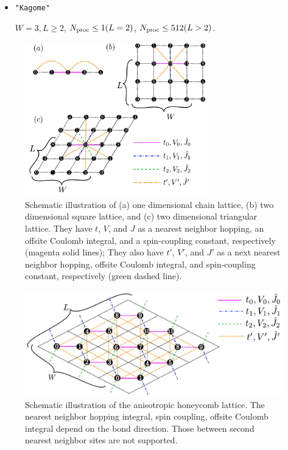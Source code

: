\begin{itemize}
\begin{itemize}
  \item \verb|"Kagome"|

    $W=3, L \geq 2$, $N_{\rm proc} \leq 1(L=2)$, $N_{\rm proc} \leq 512(L>2)$.

\end{itemize}

\begin{figure}[!tbhp]
  \begin{center}
    \includegraphics[width=8cm]{../figs/chap04_1_lattice.pdf}
    \caption{Schematic illustration of
      (a) one dimensional chain lattice, 
      (b) two dimensional square lattice, and 
      (c) two dimensional triangular lattice.
      They have $t$, $V$, and $J$ as a nearest neighbor hopping, an offsite Coulomb integral, 
      and a spin-coupling constant, respectively (magenta solid lines);
      They also have $t'$, $V'$, and $J'$ as a next nearest neighbor hopping, offsite Coulomb integral, 
      and spin-coupling constant, respectively (green dashed line).
    }
    \label{fig_chap04_1_lattice}
  \end{center}
\end{figure}

\begin{figure}[!tbhp]
  \begin{center}
    \includegraphics[width=15cm]{../figs/chap04_1_honeycomb.pdf}
    \caption{Schematic illustration of the anisotropic honeycomb lattice.
      The nearest neighbor 
      hopping integral, spin coupling, offsite Coulomb integral
      depend on the bond direction.
      Those between second nearest neighbor sites are not supported.
    }
    \label{fig_chap04_1_honeycomb}
  \end{center}
\end{figure}


\end{itemize}
